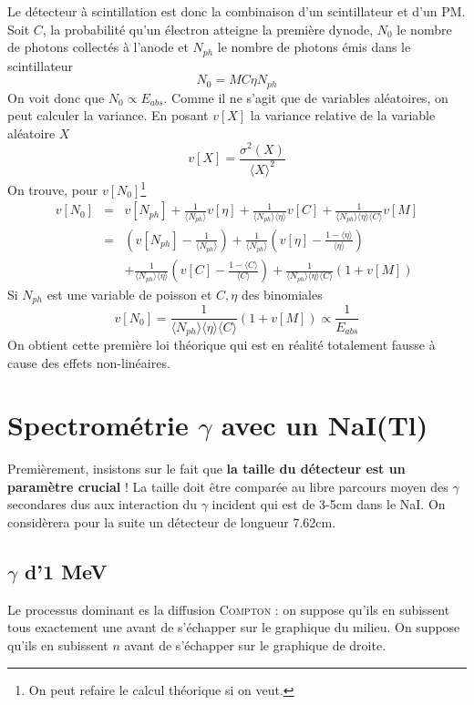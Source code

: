 Le détecteur à scintillation est donc la combinaison d'un scintillateur et d'un PM. Soit $C$, la
probabilité qu'un électron atteigne la première dynode, $N_0$ le nombre de photons collectés à 
l'anode et $N_{ph}$ le nombre de photons émis dans le scintillateur
\begin{equation}
N_0=MC\eta N_{ph}
\end{equation}
On voit donc que $N_0 \propto E_{abs}$. Comme il ne s'agit que de variables aléatoires, on peut 
calculer la variance. En posant $v[X]$ la variance relative de la variable aléatoire $X$
\begin{equation}
v[X]=\frac{\sigma^2(X)}{\langle X\rangle^2}
\end{equation}
On trouve, pour $v[N_0]$\footnote{On peut refaire le calcul théorique si on veut.}
\begin{eqnarray}
v[N_0]&=&v[N_{ph}]+\frac{1}{\langle N_{ph}\rangle}v[\eta]+\frac{1}{\langle N_{ph}\rangle\langle \eta\rangle}v[C]+\frac{1}{\langle N_{ph}\rangle\langle\eta\rangle\langle C\rangle}v[M]\\
&=&\left( v[N_{ph}]-\frac{1}{\langle N_{ph}\rangle}\right)+\frac{1}{\langle N_{ph}\rangle}\left( v[\eta]-\frac{1-\langle\eta\rangle}{\langle\eta\rangle}\right)\\
&&+\frac{1}{\langle N_{ph}\rangle \langle \eta\rangle}\left( v[C]-\frac{1-\langle C\rangle}{\langle C\rangle}\right)+\frac{1}{\langle N_{ph}\rangle\langle \eta\rangle\langle C\rangle}(1+v[M])
\end{eqnarray}
Si $N_{ph}$ est une variable de poisson et $C,\eta$ des binomiales
\begin{equation}
v[N_0]=\frac{1}{\langle N_{ph}\rangle\langle \eta\rangle\langle C\rangle}(1+v[M])\propto\frac{1}{E_{abs}}
\end{equation}
On obtient cette première loi théorique qui est en réalité totalement fausse à cause des effets
non-linéaires.


\section{Spectrométrie $\gamma$ avec un NaI(Tl)}
Premièrement, insistons sur le fait que \textbf{la taille du détecteur est un paramètre crucial} ! 
La taille doit être comparée au libre parcours moyen des $\gamma$ secondares dus aux interaction
du $\gamma$ incident qui est de 3-5cm dans le NaI. On considèrera pour la suite un détecteur de
longueur 7.62cm.


\subsection{$\gamma$ d'1 MeV}
Le processus dominant es la diffusion \textsc{Compton} : on suppose qu'ils en subissent tous 
exactement une avant de s'échapper sur le graphique du milieu. On suppose qu'ils en subissent
$n$ avant de s'échapper sur le graphique de droite.

